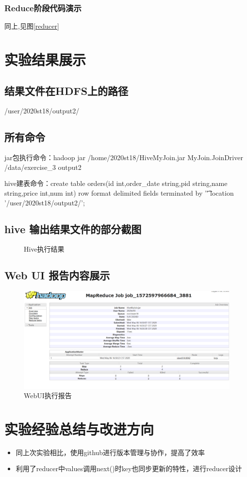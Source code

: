 \documentclass[a4paper,UTF8]{article}
\numberwithin{equation}{section}
\begin{document}
\subsubsection{Reduce阶段代码演示}
同上,见图\ref{reducer}
\section{实验结果展示}

\subsection{结果文件在HDFS上的路径}
/user/2020st18/output2/
\subsection{所有命令}
jar包执行命令：hadoop jar /home/2020st18/HiveMyJoin.jar MyJoin.JoinDriver /data/exercise\_3 output2 

hive建表命令：create table orders(id int,order\_date string,pid string,name string,price int,num int) row format delimited fields terminated by '\t' location '/user/2020st18/output2/';
\subsection{hive 输出结果文件的部分截图}
\begin{figure}[H]
	\centering
	\vfill
	
	\caption{Hive执行结果}
\end{figure}

\subsection{Web UI 报告内容展示}
\begin{figure}[H]
	\centering
	\includegraphics[width = 15cm]{job.PNG}
	\caption{WebUI执行报告}
\end{figure}
\section{实验经验总结与改进方向}
\begin{itemize}
	\item 同上次实验相比，使用github进行版本管理与协作，提高了效率
	\item 利用了reducer中values调用next()时key也同步更新的特性，进行reducer设计
\end{itemize}



\end{document}
